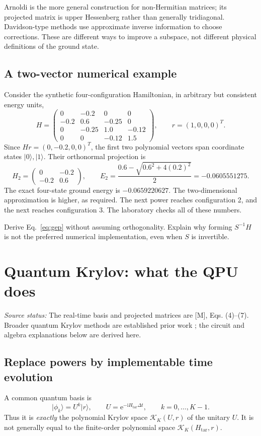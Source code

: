 \documentclass[11pt,a4paper,oneside]{report}
\newcommand{\ket}[1]{\lvert #1\rangle}
\newcommand{\Ht}{H_{\mathrm{tar}}}
\newcommand{\I}{\mathrm i}
\newcommand{\e}{\mathrm e}
\newcommand{\src}[1]{\par{\small\color{grey}\textit{Source status:} #1}\par}
\newcommand{\checkpoint}[1]{\begin{idea}[Check your understanding]#1\end{idea}}
\begin{document}
Arnoldi is the more general construction for non-Hermitian matrices; its projected matrix is upper Hessenberg rather than generally tridiagonal. Davidson-type methods use approximate inverse information to choose corrections. These are different ways to improve a subspace, not different physical definitions of the ground state.

\section{A two-vector numerical example}
Consider the synthetic four-configuration Hamiltonian, in arbitrary but consistent energy units,
\begin{equation}\label{eq:chain}
H=\begin{pmatrix}
0&-0.2&0&0\\-0.2&0.6&-0.25&0\\0&-0.25&1.0&-0.12\\0&0&-0.12&1.5
\end{pmatrix},\qquad r=(1,0,0,0)^T.
\end{equation}
Since $Hr=(0,-0.2,0,0)^T$, the first two polynomial vectors span coordinate states $\ket0,\ket1$. Their orthonormal projection is
\begin{equation}
H_2=\begin{pmatrix}0&-0.2\\-0.2&0.6\end{pmatrix},\qquad
E_2=\frac{0.6-\sqrt{0.6^2+4(0.2)^2}}{2}=-0.0605551275.
\end{equation}
The exact four-state ground energy is $-0.0659220627$. The two-dimensional approximation is higher, as required. The next power reaches configuration 2, and the next reaches configuration 3. The laboratory checks all of these numbers.

\checkpoint{Derive Eq.~\eqref{eq:gep} without assuming orthogonality. Explain why forming $S^{-1}H$ is not the preferred numerical implementation, even when $S$ is invertible.}

\chapter{Quantum Krylov: what the QPU does}\label{ch:qks}
\src{The real-time basis and projected matrices are [M], Eqs. (4)--(7). Broader quantum Krylov methods are established prior work \cite{stair,epperly}; the circuit and algebra explanations below are derived here.}

\section{Replace powers by implementable time evolution}
A common quantum basis is
\begin{equation}\label{eq:timebasis}
\ket{\phi_k}=U^k\ket r,\qquad U=\e^{-\I\Ht\Delta t},\qquad k=0,\ldots,K-1.
\end{equation}
Thus it is \emph{exactly} the polynomial Krylov space $\mathcal K_K(U,r)$ of the unitary $U$. It is not generally equal to the finite-order polynomial space $\mathcal K_K(\Ht,r)$.
\end{document}
